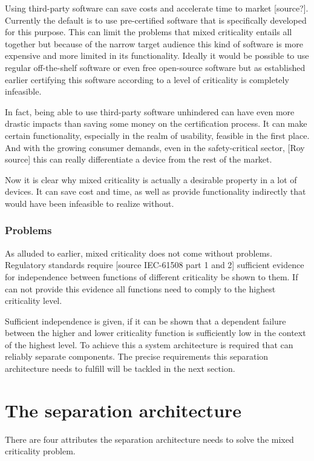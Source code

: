 Using third-party software can save costs and accelerate time to market [source?]. Currently the default is to use pre-certified software that is specifically developed for this purpose. This can limit the problems that mixed criticality entails all together but because of the narrow target audience this kind of software is more expensive and more limited in its functionality. Ideally it would be possible to use regular off-the-shelf software or even free open-source software but as established earlier certifying this software according to a level of criticality is completely infeasible.

In fact, being able to use third-party software unhindered can have even more drastic impacts than saving some money on the certification process. It can make certain functionality, especially in the realm of usability, feasible in the first place. And with the growing consumer demands, even in the safety-critical sector, [Roy source] this can really differentiate a device from the rest of the market.

Now it is clear why mixed criticality is actually a desirable property in a lot of devices. It can save cost and time, as well as provide functionality indirectly that would have been infeasible to realize without.
\subsubsection{Problems}
As alluded to earlier, mixed criticality does not come without problems. Regulatory standards require [source IEC-61508 part 1 and 2] sufficient evidence for independence between functions of different criticality be shown to them. If \mfg{} can not provide this evidence all functions need to comply to the highest criticality level.

Sufficient independence is given, if it can be shown that a dependent failure between the higher and lower criticality function is sufficiently low in the context of the highest level.
To achieve this a system architecture is required that can reliably separate components. The precise requirements this separation architecture needs to fulfill will be tackled in the next section.


\section{The separation architecture}
There are four attributes the separation architecture needs to solve the mixed criticality problem.
